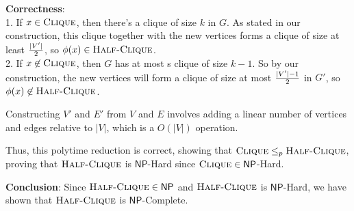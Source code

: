 \documentclass[11pt,addpoints,answers]{exam}
\newcommand{\NP}{\textsf{NP}}
\newcommand{\ptimemap}{\leq_p}
\newcommand{\clique}{\textsc{Clique}}
\newcommand{\halfclique}{\textsc{Half-Clique}}
\begin{document}
\begin{questions}
\begin{parts}
\begin{solution}
\textbf{Correctness}:\\
1. If $x\in \clique$, then there's a clique of size \(k\) in \(G\). As stated in our construction, this clique together with the new vertices forms a clique of size at least \(|V'|\over 2\), so $\phi(x) \in \halfclique$.
\\2. If $x\not \in \clique$, then $G$ has at most s clique of size $k-1$. So by our construction, the new vertices will form a clique of size at most ${|V'| -1}\over 2$ in $G'$, so $\phi(x) \not\in \halfclique$.

Constructing \(V'\) and \(E'\) from \(V\) and \(E\) involves adding a linear number of vertices and edges relative to \(|V|\), which is a $O(|V|)$ operation.

Thus, this polytime reduction is correct, showing that \(\clique \ptimemap \halfclique\), proving that \(\halfclique\) is \(\NP\)-Hard since \(\clique \in \NP\)-Hard.

\textbf{Conclusion}: Since \(\halfclique \in \NP\) and \(\halfclique\) is \(\NP\)-Hard, we have shown that \(\halfclique\) is \(\NP\)-Complete.
    \end{solution}
    
    \end{parts}

\end{questions}
\end{document}
